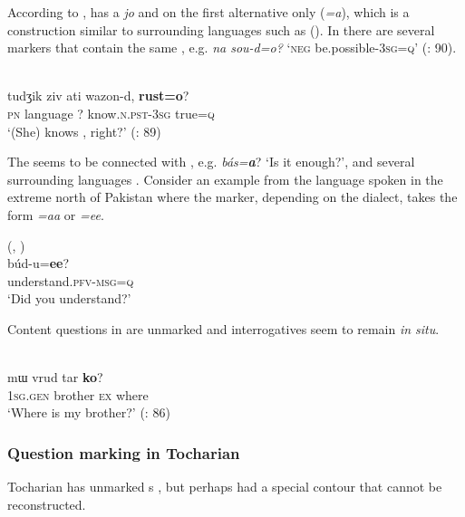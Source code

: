 According to \citet[118]{GaoErqiang1985},  has a  \textit{jo} and  on the first alternative only (\textit{=a}), which is a construction similar to surrounding languages such as  (). In  there are several  markers that contain the same , e.g. \textit{na sou-d=o?} ‘\textsc{neg} be.possible-3\textsc{sg}=\textsc{q}’ (\citealt{GaoErqiang1985}: 90).

\ea%
    \label{ex:indo:33}
    \\
    \gll tudʒik  ziv    ati  wazon-d, \textbf{{rust=o}}?\\
    \textsc{pn}  language  ?  know.\textsc{n.pst}-3\textsc{sg}  true=\textsc{q}\\
    \glt ‘(She) knows , right?’ (\citealt{GaoErqiang1985}: 89)
    \z

\noindent The  seems to be connected with , e.g. \textit{bás=}\textbf{\textit{a}}? ‘Is it enough?’, and several surrounding languages \citep[190]{Yoshioka2012}. Consider an example from the  language  spoken in the extreme north of Pakistan where the marker, depending on the dialect, takes the form \textit{=aa} or \textit{=ee}.

\ea%
    \label{ex:indo:34}
     (, )\\
    \gll búd-u=\textbf{{ee}}?\\
    understand.\textsc{pfv}-\textsc{msg}=\textsc{q}\\
    \glt ‘Did you understand?’ \citep[403]{Liljegren2016}
    \z

Content questions in  are unmarked and interrogatives seem to remain \textit{in situ}.

\ea%
    \label{ex:indo:35}
    \\
    \gll mɯ    vrud    tar \textbf{{ko}}?\\
    1\textsc{sg.gen}  brother    \textsc{ex}  where\\
    \glt ‘Where is my brother?’ (\citealt{GaoErqiang1985}: 86)
    \z

\subsubsection{Question marking in Tocharian}\label{sec:5.5.2.5}

Tocharian has unmarked s , but perhaps had a special  contour that cannot be reconstructed.

